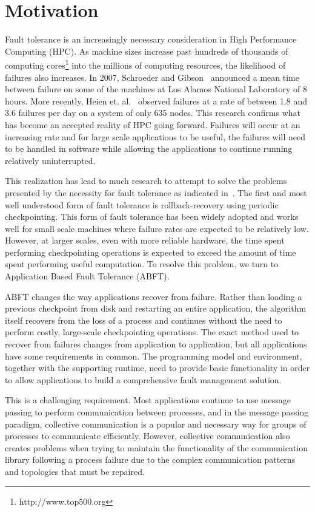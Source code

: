 \section{Motivation} \label{sect:intro}

Fault tolerance is an increasingly necessary consideration in High Performance Computing (HPC). As machine sizes increase past hundreds of thousands of computing cores\footnote{http://www.top500.org} into the millions of computing resources, the likelihood of failures also increases. In 2007, Schroeder and Gibson~\cite{schroeder2007understanding} announced a mean time between failure on some of the machines at Los Alamos National Laboratory of 8 hours. More recently, Heien et. al.~\cite{HeienModellingHPCFailures} observed failures at a rate of between 1.8 and 3.6 failures per day on a system of only 635 nodes. This research confirms what has become an accepted reality of HPC going forward. Failures will occur at an increasing rate and for large scale applications to be useful, the failures will need to be handled in software while allowing the applications to continue running relatively uninterrupted.

This realization has lead to much research to attempt to solve the problems presented by the necessity for fault tolerance as indicated in~\cite{Cappello:2009dd}. The first and most well understood form of fault tolerance is rollback-recovery using periodic checkpointing. This form of fault tolerance has been widely adopted and works well for small scale machines where failure rates are expected to be relatively low. However, at larger scales, even with more reliable hardware, the  time spent performing checkpointing operations is expected to exceed the amount of time spent performing useful computation. To resolve this problem, we turn to Application Based Fault Tolerance (ABFT).

ABFT changes the way applications recover from failure. Rather than loading a previous checkpoint from disk and restarting an entire application, the algorithm itself recovers from the loss of a process and continues without the need to perform costly, large-scale checkpointing operations. The exact method used to recover from failures changes from application to application, but all applications have some requirements in common. The programming model and environment, together with the supporting runtime, need to provide basic functionality in order to allow applications to build a comprehensive fault management solution.

This is a challenging requirement. Most applications continue to use message passing to perform communication between processes, and in the message passing paradigm, collective communication is a popular and necessary way for groups of processes to communicate efficiently. However, collective communication also creates problems when trying to maintain the functionality of the communication library following a process failure due to the complex communication patterns and topologies that must be repaired. 

